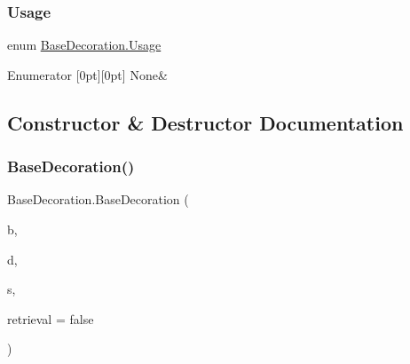 \mbox{\label{class_base_decoration_ad8b9ff9e5d7dc488ca94fed2efa45a6e}} 
\subsubsection{\texorpdfstring{Usage}{Usage}}
{\footnotesize\ttfamily enum \mbox{\hyperlink{class_base_decoration_ad8b9ff9e5d7dc488ca94fed2efa45a6e}{Base\+Decoration.\+Usage}}\hspace{0.3cm}{\ttfamily [strong]}}

\begin{DoxyEnumFields}{Enumerator}
[0pt][0pt]{}\mbox{\label{class_base_decoration_ad8b9ff9e5d7dc488ca94fed2efa45a6ea6adf97f83acf6453d4a6a4b1070f3754}} 
None&\\
\hline

\end{DoxyEnumFields}


\subsection{Constructor \& Destructor Documentation}
\mbox{\label{class_base_decoration_a75dae0a3df64d463e98ba2bdeed02265}} 
\subsubsection{\texorpdfstring{BaseDecoration()}{BaseDecoration()}}
{\footnotesize\ttfamily Base\+Decoration.\+Base\+Decoration (\begin{DoxyParamCaption}\item[{\mbox{\hyperlink{class_biome}{Biome}}}]{b,  }\item[{\mbox{\hyperlink{class_base_decoration_a8adb8095439bd24fd3c2058b2ecbbf11}{Decoration\+Type}}}]{d,  }\item[{\mbox{\hyperlink{class_sprite_manager}{Sprite\+Manager}}}]{s,  }\item[{bool}]{retrieval = {\ttfamily false} }\end{DoxyParamCaption})}

